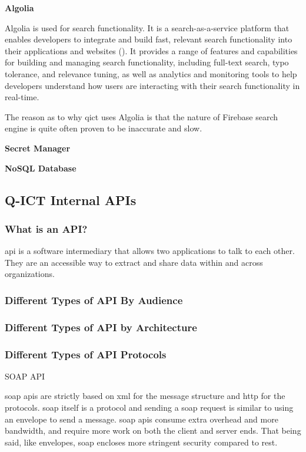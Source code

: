 \begin{multicols}{2}
      \textbf{Algolia}

      Algolia is used for search functionality. It is a search-as-a-service platform that enables developers to
      integrate and build fast, relevant search functionality into their applications and websites (\cite{algolia}).
      It provides a range of features and capabilities for building and managing search functionality, including
      full-text search, typo tolerance, and relevance tuning, as well as analytics and monitoring tools to help
      developers understand how users are interacting with their search functionality in real-time.

      The reason as to why \acrshort{qict} uses Algolia is that the nature of Firebase search engine is quite often
      proven to be inaccurate and slow.

      \textbf{Secret Manager}

      \textbf{NoSQL Database}

      \subsection{Q-ICT Internal APIs}
      \subsubsection{What is an API?}
      \acrshort{api} is a software intermediary that allows two applications to talk to each other. They are an 
      accessible way to extract and share data within and across organizations. 

      \subsubsection{Different Types of API By Audience}
      \subsubsection{Different Types of API by Architecture}
      \subsubsection{Different Types of API Protocols}\label{chap:typesofapis}
      SOAP API

      \acrshort{soap} \acrshort{api}s are strictly based on \acrshort{xml} for the message structure and 
      \acrshort{http} for the protocols. \acrshort{soap} itself is a protocol and sending a \acrshort{soap} 
      request is similar to using an envelope to send a message. \acrshort{soap} \acrshort{api}s consume extra 
      overhead and more bandwidth, and require more work on both the client and server ends. That being said, 
      like envelopes, \acrshort{soap} encloses more stringent security compared to \acrshort{rest}.
      \end{multicols}
      
